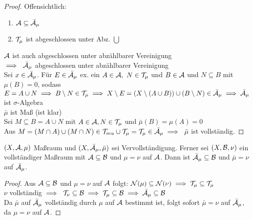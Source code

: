 \documentclass[11pt,a4paper,fleqn,openany]{report}
\begin{document}
    \begin{proof}
      Offensichtlich:
      \begin{enumerate}
        \item $\mathcal{A} \subseteq \bar{\mathcal{A}}_{\mu}$
        \item $\mathcal{T}_{\mu}$ ist abgeschlossen unter Abz. $\bigcup$
      \end{enumerate}
      $\mathcal{A}$ ist auch abgeschlossen unter abzählbarer Vereinigung\\
      $\implies \ \bar{\mathcal{A}}_{\mu}$ abgeschlossen unter abzählbarer Vereinigung\\
      Sei $x \in \bar{\mathcal{A}}_{\mu}$. Für $E \in \bar{\mathcal{A}}_{\mu}$ ex. ein $A \in \mathcal{A}, \ N \in \mathcal{T}_{\mu}$ und $B \in \mathcal{A}$ und $N \subseteq B$ mit $\mu(B) = 0$, sodass $E = A \cup N \\ \implies B \setminus N \in \mathcal{T}_{\mu} \\ \implies X \setminus E = (X \setminus (A\cup B)) \cup (B \setminus N) \in \bar{\mathcal{A}}_{\mu} \\ \implies \bar{\mathcal{A}}_{\mu}$ ist $\sigma$-Algebra \\
      $\bar{\mu}$ ist Maß (ist klar)\\
      Sei $M \subseteq B = A \cup N$ mit $A \in \mathcal{A}, N \in \mathcal{T}_{\mu}$ und $\bar{\mu}(B) = \mu(A) = 0$ \\
      Aus $M = (M \cap A) \cup (M \cap N) \in \mathcal{T}_{mu} \cup \mathcal{T}_{\mu} = \mathcal{T}_{\mu} \in \bar{\mathcal{A}}_{\mu} \\ \implies \ \bar{\mu}$ ist vollständig.  
    \end{proof}

    \begin{theorem}
      $(X, \mathcal{A}, \mu)$ Maßraum und $(X, \bar{\mathcal{A}}_{\mu}, \bar{\mu})$ sei Vervollständigung. Ferner sei $(X, \mathcal{B}, \nu)$ ein vollständiger Maßraum mit $\mathcal{A} \subseteq \mathcal{B}$ und $\mu = \nu$ auf $\mathcal{A}$. Dann ist $\bar{\mathcal{A}}_{\mu} \subseteq \mathcal{B}$ und $\bar{\mu} = \nu$ auf $\bar{\mathcal{A}}_{\mu}$. 
    \end{theorem}

    \begin{proof}
      Aus $\mathcal{A} \subseteq \mathcal{B}$ und $\mu = \nu$ auf $\mathcal{A}$ folgt: $\mathcal{N}(\mu) \subseteq \mathcal{N}(\nu) \implies \mathcal{T}_{\mu} \subseteq \mathcal{T}_{\mu}$\\
      $\nu$ vollständig $\implies \ \mathcal{T}_{\nu} \subseteq \mathcal{B} \implies \mathcal{T}_{\mu} \subseteq \mathcal{B} \implies \bar{\mathcal{A}}_{\mu} \subseteq \mathcal{B}$\\
      Da $\bar{\mu}$ auf $\bar{\mathcal{A}}_{\mu}$ vollständig durch $\mu$ auf $\mathcal{A}$ bestimmt ist, folgt sofort $\bar{\mu} = \nu$ auf $\bar{\mathcal{A}}_{\mu}$, da $\mu = \nu$ auf $\mathcal{A}$.
    \end{proof}
\end{document}
